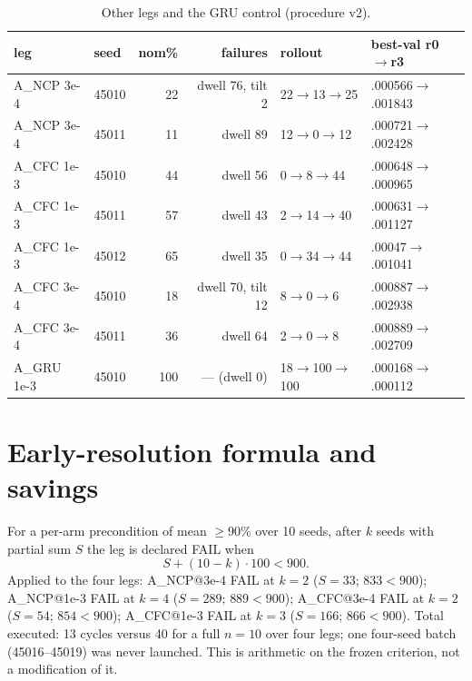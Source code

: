 \documentclass[11pt]{article}
\begin{document}
\begin{table}[h]
\centering\small
\caption{Other legs and the GRU control (procedure v2).}
\begin{tabular}{llrrll}
\toprule
leg & seed & nom\% & failures & rollout & best-val r0$\to$r3 \\
\midrule
A\_NCP 3e-4 & 45010 & 22 & dwell 76, tilt 2 & 22$\to$13$\to$25 & .000566$\to$.001843 \\
A\_NCP 3e-4 & 45011 & 11 & dwell 89 & 12$\to$0$\to$12 & .000721$\to$.002428 \\
A\_CFC 1e-3 & 45010 & 44 & dwell 56 & 0$\to$8$\to$44 & .000648$\to$.000965 \\
A\_CFC 1e-3 & 45011 & 57 & dwell 43 & 2$\to$14$\to$40 & .000631$\to$.001127 \\
A\_CFC 1e-3 & 45012 & 65 & dwell 35 & 0$\to$34$\to$44 & .00047$\to$.001041 \\
A\_CFC 3e-4 & 45010 & 18 & dwell 70, tilt 12 & 8$\to$0$\to$6 & .000887$\to$.002938 \\
A\_CFC 3e-4 & 45011 & 36 & dwell 64 & 2$\to$0$\to$8 & .000889$\to$.002709 \\
A\_GRU 1e-3 & 45010 & 100 & --- (dwell 0) & 18$\to$100$\to$100 & .000168$\to$.000112 \\
\bottomrule
\end{tabular}
\end{table}

\section{Early-resolution formula and savings}\label{app:early}
For a per-arm precondition of mean $\geq$90\% over 10 seeds, after $k$ seeds with partial sum $S$ the leg is declared FAIL when
\[ S + (10-k)\cdot 100 < 900. \]
Applied to the four legs: A\_NCP@3e-4 FAIL at $k{=}2$ ($S{=}33$; $833<900$); A\_NCP@1e-3 FAIL at $k{=}4$ ($S{=}289$; $889<900$); A\_CFC@3e-4 FAIL at $k{=}2$ ($S{=}54$; $854<900$); A\_CFC@1e-3 FAIL at $k{=}3$ ($S{=}166$; $866<900$). Total executed: 13 cycles versus 40 for a full $n{=}10$ over four legs; one four-seed batch (45016--45019) was never launched. This is arithmetic on the frozen criterion, not a modification of it.



\end{document}
